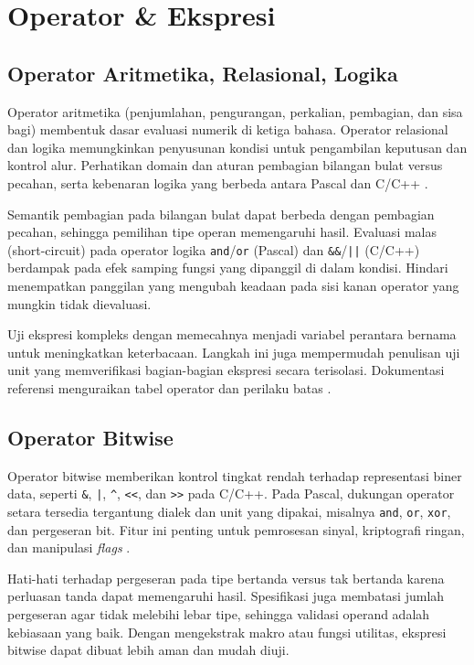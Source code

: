 \documentclass[../main.tex]{subfiles}
\begin{document}
\chapter{Operator \& Ekspresi}
\section{Operator Aritmetika, Relasional, Logika}
Operator aritmetika (penjumlahan, pengurangan, perkalian, pembagian, dan sisa bagi) membentuk dasar evaluasi numerik di ketiga bahasa. Operator relasional dan logika memungkinkan penyusunan kondisi untuk pengambilan keputusan dan kontrol alur. Perhatikan domain dan aturan pembagian bilangan bulat versus pecahan, serta kebenaran logika yang berbeda antara Pascal dan C/C++ \parencite{pascal-tutorial-wikibooks,gnu-c-manual,cpp-reference}.

Semantik pembagian pada bilangan bulat dapat berbeda dengan pembagian pecahan, sehingga pemilihan tipe operan memengaruhi hasil. Evaluasi malas (short-circuit) pada operator logika \texttt{and}/\texttt{or} (Pascal) dan \texttt{\&\&}/\texttt{||} (C/C++) berdampak pada efek samping fungsi yang dipanggil di dalam kondisi. Hindari menempatkan panggilan yang mengubah keadaan pada sisi kanan operator yang mungkin tidak dievaluasi.

Uji ekspresi kompleks dengan memecahnya menjadi variabel perantara bernama untuk meningkatkan keterbacaan. Langkah ini juga mempermudah penulisan uji unit yang memverifikasi bagian-bagian ekspresi secara terisolasi. Dokumentasi referensi menguraikan tabel operator dan perilaku batas \parencite{pascal-tutorial-wikibooks,gnu-c-manual,cpp-reference}.

\section{Operator Bitwise}
Operator bitwise memberikan kontrol tingkat rendah terhadap representasi biner data, seperti \texttt{\&}, \texttt{|}, \texttt{\^{}}, \texttt{<<}, dan \texttt{>>} pada C/C++. Pada Pascal, dukungan operator setara tersedia tergantung dialek dan unit yang dipakai, misalnya \texttt{and}, \texttt{or}, \texttt{xor}, dan pergeseran bit. Fitur ini penting untuk pemrosesan sinyal, kriptografi ringan, dan manipulasi \emph{flags} \parencite{free-pascal-docs,iso-c-draft-n1570,cpp-reference}.

Hati-hati terhadap pergeseran pada tipe bertanda versus tak bertanda karena perluasan tanda dapat memengaruhi hasil. Spesifikasi juga membatasi jumlah pergeseran agar tidak melebihi lebar tipe, sehingga validasi operand adalah kebiasaan yang baik. Dengan mengekstrak makro atau fungsi utilitas, ekspresi bitwise dapat dibuat lebih aman dan mudah diuji.
\end{document}
